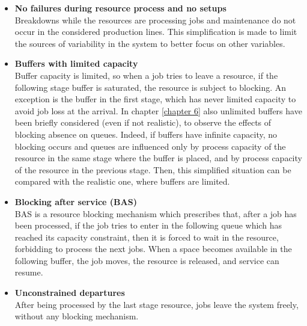 \begin{itemize}
\item \textbf{No failures during resource process and no setups}\\
Breakdowns while the resources are processing jobs and maintenance do not occur in the considered production lines. This simplification is made to limit the sources of variability in the system to better focus on other variables. 
\item \textbf{Buffers with limited capacity}\\
Buffer capacity is limited, so when a job tries to leave a resource, if the following stage buffer is saturated, the resource is subject to blocking. An exception is the buffer in the first stage, which has never limited capacity to avoid job loss at the arrival. In chapter \ref{chapter 6} also unlimited buffers have been briefly considered (even if not realistic), to observe the effects of blocking absence on queues. Indeed, if buffers have infinite capacity, no blocking occurs and queues are influenced only by process capacity of the resource in the same stage where the buffer is placed, and by process capacity of the resource in the previous stage. Then, this simplified situation can be compared with the realistic one, where buffers are limited.
\item \textbf{Blocking after service (BAS)}\\
BAS is a resource blocking mechanism which prescribes that, after a job has been processed, if the job tries to enter in the following queue which has reached its capacity constraint, then it is forced to wait in the resource, forbidding to process the next jobs. When a space becomes available in the following buffer, the job moves, the resource is released, and service can resume.
\item \textbf{Unconstrained departures}\\
After being processed by the last stage resource, jobs leave the system freely, without any blocking mechanism.
\end{itemize}
